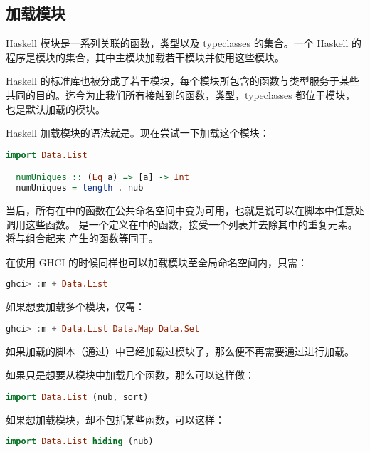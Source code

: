\documentclass[./main.tex]{subfiles}
\begin{document}
\subsection*{加载模块}

Haskell 模块是一系列关联的函数，类型以及 typeclasses 的集合。一个 Haskell 的程序是模块的集合，其中主模块加载若干模块并使用这些模块。

Haskell 的标准库也被分成了若干模块，每个模块所包含的函数与类型服务于某些共同的目的。迄今为止我们所有接触到的函数，类型，typeclasses
都位于模块，也是默认加载的模块。

Haskell 加载模块的语法就是。现在尝试一下加载这个模块：

\begin{lstlisting}[language=Haskell]
  import Data.List

  numUniques :: (Eq a) => [a] -> Int
  numUniques = length . nub
\end{lstlisting}

当后，所有在中的函数在公共命名空间中变为可用，也就是说可以在脚本中任意处调用这些函数。
是一个定义在中的函数，接受一个列表并去除其中的重复元素。将与组合起来
产生的函数等同于。

在使用 GHCI 的时候同样也可以加载模块至全局命名空间内，只需：

\begin{lstlisting}[language=Haskell]
  ghci> :m + Data.List
\end{lstlisting}

如果想要加载多个模块，仅需：

\begin{lstlisting}[language=Haskell]
  ghci> :m + Data.List Data.Map Data.Set
\end{lstlisting}

如果加载的脚本（通过）中已经加载过模块了，那么便不再需要通过进行加载。

如果只是想要从模块中加载几个函数，那么可以这样做：

\begin{lstlisting}[language=Haskell]
  import Data.List (nub, sort)
\end{lstlisting}

如果想加载模块，却不包括某些函数，可以这样：

\begin{lstlisting}[language=Haskell]
  import Data.List hiding (nub)
\end{lstlisting}
\end{document}
